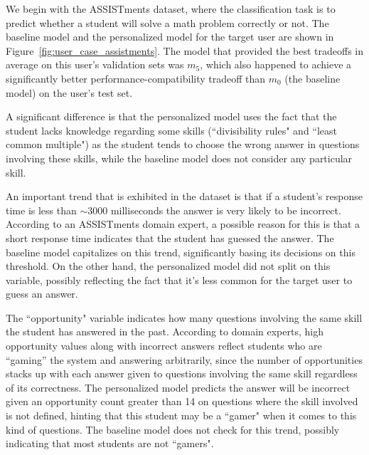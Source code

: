 \documentclass[letterpaper]{article} %
\theoremstyle{definition}
\begin{document}
We begin with the ASSISTments dataset, where the classification task is to predict whether a student will solve a math problem correctly or not.  The baseline model and the personalized model for the target user are shown in Figure~\ref{fig:user_case_assistments}.
The model that provided the best tradeoffs in average on this user's validation sets was $m_5$, which also happened to achieve a significantly better performance-compatibility tradeoff than $m_0$ (the baseline model) on the user's test set.


A significant difference is that the personalized model uses the fact that the student lacks knowledge regarding some skills (``divisibility rules" and ``least common multiple") as the student tends to choose the wrong answer in questions involving these skills, while the baseline model does not consider any particular skill.

An important  trend that is  exhibited in  the dataset is that if a student's response time is less than $\sim$3000 milliseconds the answer is very likely to be incorrect.
According to an ASSISTments domain expert, a possible reason for this is that a short response time indicates that the student has guessed the answer.
The baseline model capitalizes on this trend, significantly basing its decisions on this threshold.
On the other hand, the personalized model did not split on this variable, possibly reflecting the fact that it's less common for the target user to guess an answer.

The ``opportunity" variable indicates how many questions involving the same skill the student has answered in the past.
According to domain experts, high opportunity values along with incorrect answers reflect students who are ``gaming'' the system and answering arbitrarily, since the number of opportunities stacks up with each answer given to questions involving the same skill regardless of its correctness.
The personalized model predicts the answer will be incorrect given an opportunity count greater than 14 on questions where the skill involved is not defined, hinting that this student may be a ``gamer" when it comes to this kind of questions. The baseline model does not check for this trend, possibly indicating that most students are not ``gamers".
\end{document}
